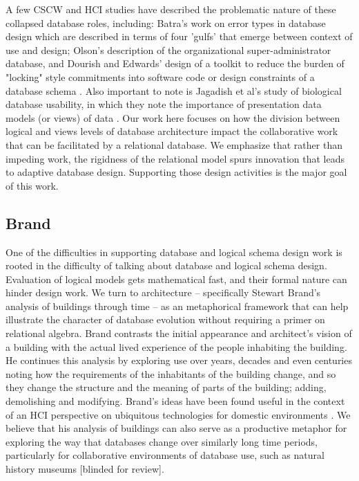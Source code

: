 A few CSCW and HCI studies have described the problematic nature of these collapsed database roles, including: Batra's work on error types in database design \cite{Batra_1993} which are described in terms of  four 'gulfs' that emerge between context of use and design; Olson's description of the organizational super-administrator \cite{olson2010database} database, and Dourish and Edwards' design of a toolkit to reduce the burden of "locking" style commitments into software code or design constraints of a database schema \cite{Dourish_2000}. Also important to note is Jagadish et al's study of biological database usability, in which they note the importance of presentation data models (or views) of data \cite{jagadish2007making}. Our work here focuses on how the division between logical and views levels of database architecture impact the collaborative work that can be facilitated by a relational database. We emphasize that rather than impeding work, the rigidness of the relational model spurs innovation that leads to adaptive database design. Supporting those design activities is the major goal of this work. 

\subsection{Brand}

One of the difficulties in supporting database and logical schema design work is rooted in the difficulty of talking about database and logical schema design. Evaluation of logical models gets mathematical fast, and their formal nature can hinder design work. We turn to architecture -- specifically Stewart Brand’s analysis of buildings through time \cite{brand1995buildings} -- as an metaphorical framework that can help illustrate the character of database evolution without requiring a primer on relational algebra. Brand contrasts the initial appearance and architect’s vision of a building with the actual lived experience of the people inhabiting the building. He continues this analysis by exploring use over years, decades and even centuries noting how the requirements of the inhabitants of the building change, and so they change the structure and the meaning of parts of the building; adding, demolishing and modifying. Brand’s ideas have been found useful in the context of an HCI perspective on ubiquitous technologies for domestic environments \cite{rodden2003evolution}. We believe that his analysis of buildings can also serve as a productive metaphor for exploring the way that databases change over similarly long time periods, particularly for collaborative environments of database use, such as natural history museums [blinded for review]. 

